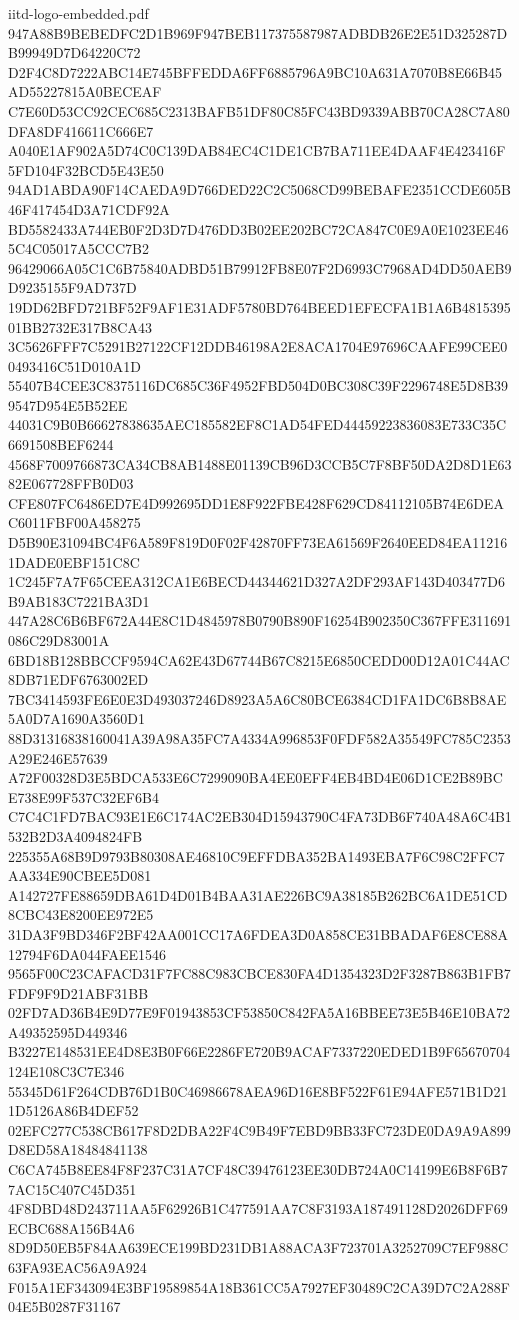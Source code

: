 \begin{filecontents*}[overwrite]{iitd-logo-embedded.pdf}
947A88B9BEBEDFC2D1B969F947BEB117375587987ADBDB26E2E51D325287DB99949D7D64220C72
D2F4C8D7222ABC14E745BFFEDDA6FF6885796A9BC10A631A7070B8E66B45AD55227815A0BECEAF
C7E60D53CC92CEC685C2313BAFB51DF80C85FC43BD9339ABB70CA28C7A80DFA8DF416611C666E7
A040E1AF902A5D74C0C139DAB84EC4C1DE1CB7BA711EE4DAAF4E423416F5FD104F32BCD5E43E50
94AD1ABDA90F14CAEDA9D766DED22C2C5068CD99BEBAFE2351CCDE605B46F417454D3A71CDF92A
BD5582433A744EB0F2D3D7D476DD3B02EE202BC72CA847C0E9A0E1023EE465C4C05017A5CCC7B2
96429066A05C1C6B75840ADBD51B79912FB8E07F2D6993C7968AD4DD50AEB9D9235155F9AD737D
19DD62BFD721BF52F9AF1E31ADF5780BD764BEED1EFECFA1B1A6B481539501BB2732E317B8CA43
3C5626FFF7C5291B27122CF12DDB46198A2E8ACA1704E97696CAAFE99CEE00493416C51D010A1D
55407B4CEE3C8375116DC685C36F4952FBD504D0BC308C39F2296748E5D8B399547D954E5B52EE
44031C9B0B66627838635AEC185582EF8C1AD54FED44459223836083E733C35C6691508BEF6244
4568F7009766873CA34CB8AB1488E01139CB96D3CCB5C7F8BF50DA2D8D1E6382E067728FFB0D03
CFE807FC6486ED7E4D992695DD1E8F922FBE428F629CD84112105B74E6DEAC6011FBF00A458275
D5B90E31094BC4F6A589F819D0F02F42870FF73EA61569F2640EED84EA112161DADE0EBF151C8C
1C245F7A7F65CEEA312CA1E6BECD44344621D327A2DF293AF143D403477D6B9AB183C7221BA3D1
447A28C6B6BF672A44E8C1D4845978B0790B890F16254B902350C367FFE311691086C29D83001A
6BD18B128BBCCF9594CA62E43D67744B67C8215E6850CEDD00D12A01C44AC8DB71EDF6763002ED
7BC3414593FE6E0E3D493037246D8923A5A6C80BCE6384CD1FA1DC6B8B8AE5A0D7A1690A3560D1
88D31316838160041A39A98A35FC7A4334A996853F0FDF582A35549FC785C2353A29E246E57639
A72F00328D3E5BDCA533E6C7299090BA4EE0EFF4EB4BD4E06D1CE2B89BCE738E99F537C32EF6B4
C7C4C1FD7BAC93E1E6C174AC2EB304D15943790C4FA73DB6F740A48A6C4B1532B2D3A4094824FB
225355A68B9D9793B80308AE46810C9EFFDBA352BA1493EBA7F6C98C2FFC7AA334E90CBEE5D081
A142727FE88659DBA61D4D01B4BAA31AE226BC9A38185B262BC6A1DE51CD8CBC43E8200EE972E5
31DA3F9BD346F2BF42AA001CC17A6FDEA3D0A858CE31BBADAF6E8CE88A12794F6DA044FAEE1546
9565F00C23CAFACD31F7FC88C983CBCE830FA4D1354323D2F3287B863B1FB7FDF9F9D21ABF31BB
02FD7AD36B4E9D77E9F01943853CF53850C842FA5A16BBEE73E5B46E10BA72A49352595D449346
B3227E148531EE4D8E3B0F66E2286FE720B9ACAF7337220EDED1B9F65670704124E108C3C7E346
55345D61F264CDB76D1B0C46986678AEA96D16E8BF522F61E94AFE571B1D211D5126A86B4DEF52
02EFC277C538CB617F8D2DBA22F4C9B49F7EBD9BB33FC723DE0DA9A9A899D8ED58A18484841138
C6CA745B8EE84F8F237C31A7CF48C39476123EE30DB724A0C14199E6B8F6B77AC15C407C45D351
4F8DBD48D243711AA5F62926B1C477591AA7C8F3193A187491128D2026DFF69ECBC688A156B4A6
8D9D50EB5F84AA639ECE199BD231DB1A88ACA3F723701A3252709C7EF988C63FA93EAC56A9A924
F015A1EF343094E3BF19589854A18B361CC5A7927EF30489C2CA39D7C2A288F04E5B0287F31167

\end{filecontents*}
